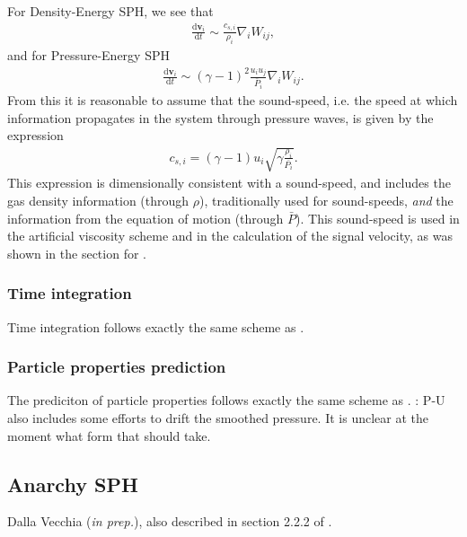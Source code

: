 For Density-Energy SPH, we see that
\begin{align}
  \frac{\mathrm{d}\mathbf{v}_i}{\mathrm{d} t} \sim \frac{c_{s, i}}{\rho_i} \nabla_i W_{ij},
  \nonumber
\end{align}
and for Pressure-Energy SPH
\begin{align}
  \frac{\mathrm{d}\mathbf{v}_i}{\mathrm{d} t} \sim (\gamma - 1)^2 \frac{u_i u_j}{\bar{P}_i}
                                     \nabla_i W_{ij}.
  \nonumber
\end{align}
From this it is reasonable to assume that the sound-speed, i.e. the speed at which
information propagates in the system through pressure waves, is given by the expression
\begin{align}
  c_{s, i} = (\gamma - 1) u_i \sqrt{\gamma \frac{\rho_i}{\bar{P_i}}}.
  \label{eq:sph:pu:soundspeed}
\end{align}
This expression is dimensionally consistent with a sound-speed, and includes the gas
density information (through $\rho$), traditionally used for sound-speeds, \emph{and}
the information from the equation of motion (through $\bar{P}$). This sound-speed is
used in the artificial viscosity scheme and in the calculation of the signal velocity,
as was shown in the section for \MinimalSPH.

\subsubsection{Time integration}

Time integration follows exactly the same scheme as \MinimalSPH. 

\subsubsection{Particle properties prediction}

The prediciton of particle properties follows exactly the same scheme as
\MinimalSPH. \TODO: P-U also includes some efforts to drift the smoothed pressure.
It is unclear at the moment what form that should take.



\subsection{Anarchy SPH}
Dalla Vecchia (\textit{in prep.}), also described in section 2.2.2 of
\cite{Schaller2015}.\\
\label{sec:sph:anarchy}
\tbd 
